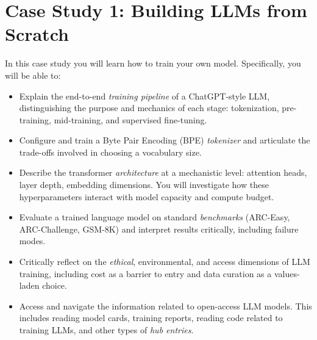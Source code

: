 % 

\lstset{
  basicstyle=\ttfamily\footnotesize,
  breaklines=true,
  frame=single,
  numbers=left,
  numberstyle=\tiny,
  xleftmargin=2em,
  framexleftmargin=2em,
}




\chapter{Case Study 1: Building LLMs from Scratch}
\label{ch:nanochat}
    
\begin{learningbox}
In this case study you will learn how to train your own model. 
Specifically, you will be able to:
\begin{itemize}[leftmargin=*, nosep]
    \item Explain the end-to-end {\em training pipeline} of a ChatGPT-style LLM, distinguishing the purpose and mechanics of each stage: tokenization, pre-training, mid-training, and supervised fine-tuning.
    \item Configure and train a Byte Pair Encoding (BPE) {\em tokenizer} and articulate the trade-offs involved in choosing a vocabulary size.
    \item Describe the transformer {\em architecture} at a mechanistic level: attention heads, layer depth, embedding dimensions. You will investigate how these hyperparameters interact with model capacity and compute budget.
    \item Evaluate a trained language model on standard {\em benchmarks} (ARC-Easy, ARC-Challenge, GSM-8K) and interpret results critically, including failure modes.
    \item Critically reflect on the {\em ethical}, environmental, and access dimensions of LLM training, including cost as a barrier to entry and data curation as a values-laden choice.
    \item Access and navigate the information related to open-access LLM models. This includes reading model cards, training reports, reading code related to training LLMs, and other types of {\em hub entries}.
\end{itemize}
\end{learningbox}


